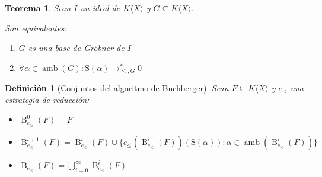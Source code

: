 \documentclass{amsbook} %
\theoremstyle{customstyle}
\newtheorem{definition}{Definición}[section]
\newtheorem{theorem}{Teorema}[section]
\DeclareMathOperator{\amb}{amb}
\renewcommand{\S}{\text{S}}
\DeclareMathOperator{\B}{B}
\begin{document}
\begin{theorem}\label{thm:equivalencias de base de Gröbner (con ambs)}
Sean $I$ un ideal de $K⟨X⟩$ y $G ⊆ K⟨X⟩$.

Son equivalentes:
\begin{enumerate}
\item $G$ es una base de Gröbner de $I$

\item $∀α ∈ \amb(G) : \S(α) →^*_{≤, G} 0$

\end{enumerate}
\end{theorem}


\begin{definition}[Conjuntos del algoritmo de Buchberger]
Sean $F ⊆ K⟨X⟩$ y $e_≤$ una estrategia de reducción:
\begin{itemize}
\item $\B_{e_≤}^0(F) = F$
\item $\B_{e_≤}^{i + 1}(F) = \B_{e_≤}^i(F) ∪ \{e_≤(\B_{e_≤}^i(F))(\S(α)) : α ∈ \amb(\B_{e_≤}^i(F))\}$
\item $\B_{e_≤}(F) = ⋃_{i = 0}^∞ \B_{e_≤}^i(F)$
\end{itemize}
\end{definition}
\end{document}
